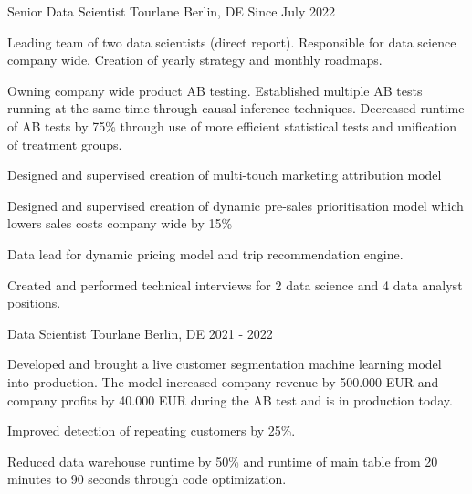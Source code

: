 
\begin{section}[Experience]

  \entry%
    {Senior Data Scientist} %
    {Tourlane} %
    {Berlin, DE} %
    {Since July 2022} %
    {%
    \begin{entrylist}
      \item Leading team of two data scientists (direct report). Responsible for data science company wide. Creation of yearly strategy and monthly roadmaps.
      \item Owning company wide product AB testing. Established multiple AB tests running at the same time through causal inference techniques. Decreased runtime of AB tests by 75\% through use of more efficient statistical tests and unification of treatment groups.
      \item Designed and supervised creation of multi-touch marketing attribution model
      \item Designed and supervised creation of dynamic pre-sales prioritisation model which lowers sales costs company wide by 15\%
      \item Data lead for dynamic pricing model and trip recommendation engine.
      \item Created and performed technical interviews for 2 data science and 4 data analyst positions.
    \end{entrylist}
    }%

  \entry%
    {Data Scientist} %
    {Tourlane} %
    {Berlin, DE} %
    {2021 - 2022} %
    {%
    \begin{entrylist}
      \item Developed and brought a live customer segmentation machine learning model into production. The model increased company revenue by 500.000 EUR and company profits by 40.000 EUR during the AB test and is in production today.
      \item Improved detection of repeating customers by 25\%.
      \item Reduced data warehouse runtime by 50\% and runtime of main table from 20 minutes to 90 seconds through code optimization.
    \end{entrylist}
    }%
\end{section}

